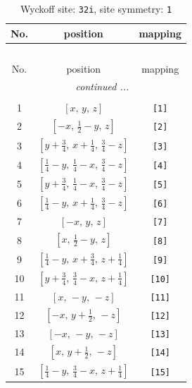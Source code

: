 \documentclass[fleqn,8pt]{jsarticle}
\begin{document}
\renewcommand{\arraystretch}{1.2}
\begin{longtable}{ccc}
\caption{Wyckoff site: {\tt 32i}, site symmetry: {\tt 1}}
 \\
 \hline \hline
No. & position & mapping \\ \hline \endfirsthead

\multicolumn{2}{l}{\tablename\ \thetable{}} \\
 \hline \hline
No. & position & mapping \\ \hline \endhead

 \hline \hline
\multicolumn{2}{r}{\footnotesize\it continued ...} \\ \endfoot

 \hline \hline
\multicolumn{2}{r}{} \\ \endlastfoot

1 & $\left[ x,\, y,\, z \right]$ & {\tt [1]} \\ \hline
2 & $\left[ - x,\, \frac{1}{2} - y,\, z \right]$ & {\tt [2]} \\ \hline
3 & $\left[ y + \frac{3}{4},\, x + \frac{1}{4},\, \frac{3}{4} - z \right]$ & {\tt [3]} \\ \hline
4 & $\left[ \frac{1}{4} - y,\, \frac{1}{4} - x,\, \frac{3}{4} - z \right]$ & {\tt [4]} \\ \hline
5 & $\left[ y + \frac{3}{4},\, \frac{1}{4} - x,\, \frac{3}{4} - z \right]$ & {\tt [5]} \\ \hline
6 & $\left[ \frac{1}{4} - y,\, x + \frac{1}{4},\, \frac{3}{4} - z \right]$ & {\tt [6]} \\ \hline
7 & $\left[ - x,\, y,\, z \right]$ & {\tt [7]} \\ \hline
8 & $\left[ x,\, \frac{1}{2} - y,\, z \right]$ & {\tt [8]} \\ \hline
9 & $\left[ \frac{1}{4} - y,\, x + \frac{3}{4},\, z + \frac{1}{4} \right]$ & {\tt [9]} \\ \hline
10 & $\left[ y + \frac{3}{4},\, \frac{3}{4} - x,\, z + \frac{1}{4} \right]$ & {\tt [10]} \\ \hline
11 & $\left[ x,\, - y,\, - z \right]$ & {\tt [11]} \\ \hline
12 & $\left[ - x,\, y + \frac{1}{2},\, - z \right]$ & {\tt [12]} \\ \hline
13 & $\left[ - x,\, - y,\, - z \right]$ & {\tt [13]} \\ \hline
14 & $\left[ x,\, y + \frac{1}{2},\, - z \right]$ & {\tt [14]} \\ \hline
15 & $\left[ \frac{1}{4} - y,\, \frac{3}{4} - x,\, z + \frac{1}{4} \right]$ & {\tt [15]} \\ \hline

\end{longtable}
\end{document}
